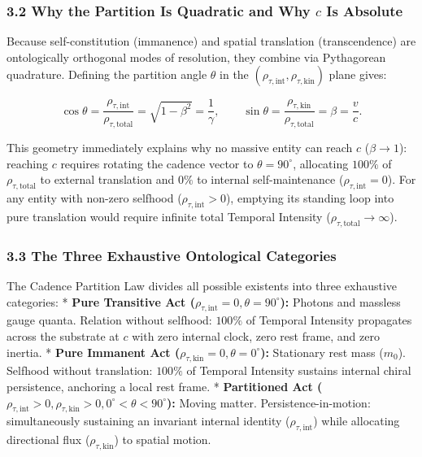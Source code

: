 \documentclass[
]{article}
\begin{document}
\subsubsection{\texorpdfstring{3.2 Why the Partition Is Quadratic and
Why \(c\) Is
Absolute}{3.2 Why the Partition Is Quadratic and Why c Is Absolute}}\label{why-the-partition-is-quadratic-and-why-c-is-absolute}

Because self-constitution (immanence) and spatial translation
(transcendence) are ontologically orthogonal modes of resolution, they
combine via Pythagorean quadrature. Defining the partition angle
\(\theta\) in the \((\rho_{\tau,\text{int}}, \rho_{\tau,\text{kin}})\)
plane gives:

\[\cos\theta = \frac{\rho_{\tau,\text{int}}}{\rho_{\tau,\text{total}}} = \sqrt{1 - \beta^2} = \frac{1}{\gamma}, \qquad \sin\theta = \frac{\rho_{\tau,\text{kin}}}{\rho_{\tau,\text{total}}} = \beta = \frac{v}{c}.\]

This geometry immediately explains why no massive entity can reach \(c\)
(\(\beta \to 1\)): reaching \(c\) requires rotating the cadence vector
to \(\theta = 90^\circ\), allocating \(100\%\) of
\(\rho_{\tau,\text{total}}\) to external translation and \(0\%\) to
internal self-maintenance (\(\rho_{\tau,\text{int}} = 0\)). For any
entity with non-zero selfhood (\(\rho_{\tau,\text{int}} > 0\)), emptying
its standing loop into pure translation would require infinite total
Temporal Intensity (\(\rho_{\tau,\text{total}} \to \infty\)).

\subsubsection{3.3 The Three Exhaustive Ontological
Categories}\label{the-three-exhaustive-ontological-categories}

The Cadence Partition Law divides all possible existents into three
exhaustive categories: * \textbf{Pure Transitive Act
(\(\rho_{\tau,\text{int}} = 0, \theta = 90^\circ\)):} Photons and
massless gauge quanta. Relation without selfhood: \(100\%\) of Temporal
Intensity propagates across the substrate at \(c\) with zero internal
clock, zero rest frame, and zero inertia. * \textbf{Pure Immanent Act
(\(\rho_{\tau,\text{kin}} = 0, \theta = 0^\circ\)):} Stationary rest
mass (\(m_0\)). Selfhood without translation: \(100\%\) of Temporal
Intensity sustains internal chiral persistence, anchoring a local rest
frame. * \textbf{Partitioned Act
(\(\rho_{\tau,\text{int}} > 0, \rho_{\tau,\text{kin}} > 0, 0^\circ < \theta < 90^\circ\)):}
Moving matter. Persistence-in-motion: simultaneously sustaining an
invariant internal identity (\(\rho_{\tau,\text{int}}\)) while
allocating directional flux (\(\rho_{\tau,\text{kin}}\)) to spatial
motion.
\end{document}
